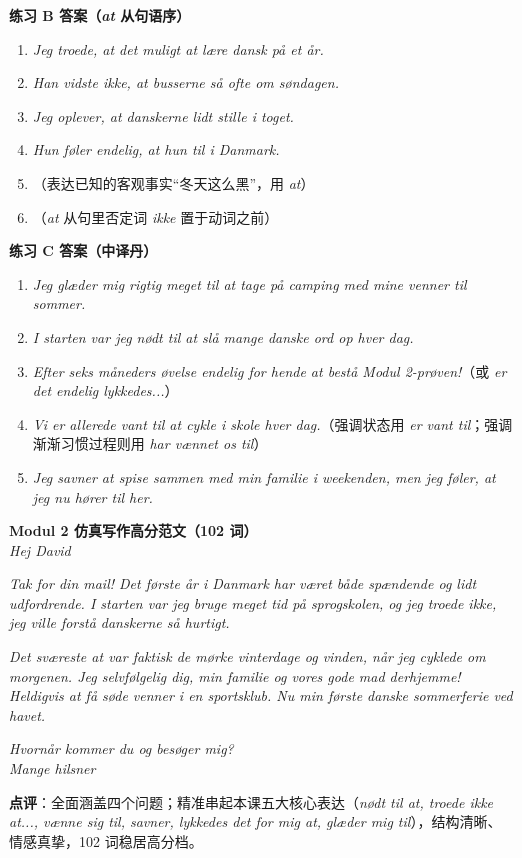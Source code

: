 \begin{answerbox}
\textbf{练习 B 答案（\textit{at} 从句语序）}
\begin{enumerate}
  \item \textit{Jeg troede, at det  muligt at lære dansk på et år.}
  \item \textit{Han vidste ikke, at busserne  så ofte om søndagen.}
  \item \textit{Jeg oplever, at danskerne  lidt stille i toget.}
  \item \textit{Hun føler endelig, at hun  til i Danmark.}
  \item {}（表达已知的客观事实“冬天这么黑”，用 \textit{at}）
  \item {}（\textit{at} 从句里否定词 \textit{ikke} 置于动词之前）
\end{enumerate}

\textbf{练习 C 答案（中译丹）}
\begin{enumerate}
  \item \textit{Jeg glæder mig rigtig meget til at tage på camping med mine venner til sommer.}
  \item \textit{I starten var jeg nødt til at slå mange danske ord op hver dag.}
  \item \textit{Efter seks måneders øvelse  endelig for hende at bestå Modul 2-prøven!}（或 \textit{er det endelig lykkedes...}）
  \item \textit{Vi er allerede vant til at cykle i skole hver dag.}（强调状态用 \textit{er vant til}；强调渐渐习惯过程则用 \textit{har vænnet os til}）
  \item \textit{Jeg savner at spise sammen med min familie i weekenden, men jeg føler, at jeg nu hører til her.}
\end{enumerate}

\textbf{Modul 2 仿真写作高分范文（102 词）}\\
\textit{Hej David}

\textit{Tak for din mail! Det første år i Danmark har været både spændende og lidt udfordrende. I starten var jeg  bruge meget tid på sprogskolen, og jeg troede ikke,  jeg ville forstå danskerne så hurtigt.}

\textit{Det sværeste at  var faktisk de mørke vinterdage og vinden, når jeg cyklede om morgenen. Jeg  selvfølgelig dig, min familie og vores gode mad derhjemme! Heldigvis  at få søde venner i en sportsklub. Nu  min første danske sommerferie ved havet.}

\textit{Hvornår kommer du og besøger mig?\\
Mange hilsner\\
}

\small\textbf{点评}：全面涵盖四个问题；精准串起本课五大核心表达（\textit{nødt til at, troede ikke at..., vænne sig til, savner, lykkedes det for mig at, glæder mig til}），结构清晰、情感真挚，102 词稳居高分档。
\end{answerbox}
